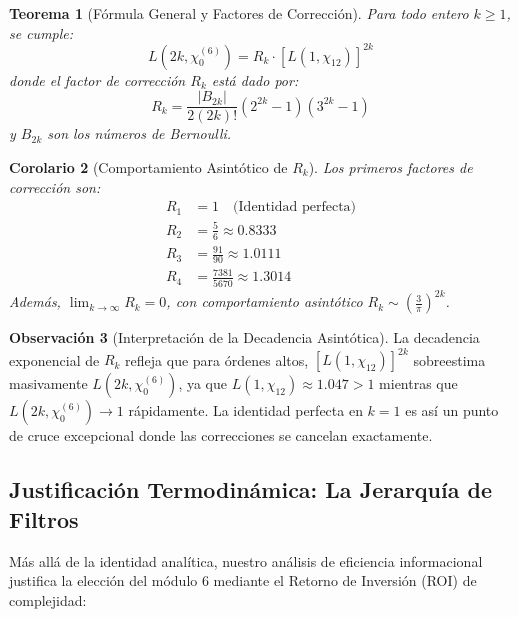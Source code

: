 \documentclass[12pt, a4paper]{article}
\theoremstyle{plain}
\newtheorem{teorema}{Teorema}[section]
\newtheorem{corolario}[teorema]{Corolario}
\theoremstyle{definition}
\newtheorem{observacion}[teorema]{Observación}
\begin{document}
\begin{teorema}[Fórmula General y Factores de Corrección]
\label{teo:factores_correccion}
Para todo entero $k \geq 1$, se cumple:
\[
L(2k,\chi_0^{(6)}) = R_k \cdot [L(1,\chi_{12})]^{2k}
\]
donde el factor de corrección $R_k$ está dado por:
\[
R_k = \frac{|B_{2k}|}{2(2k)!} (2^{2k}-1)(3^{2k}-1)
\]
y $B_{2k}$ son los números de Bernoulli.
\end{teorema}

\begin{corolario}[Comportamiento Asintótico de $R_k$]
Los primeros factores de corrección son:
\begin{align*}
R_1 &= 1 \quad \text{(Identidad perfecta)} \\
R_2 &= \frac{5}{6} \approx 0.8333 \\
R_3 &= \frac{91}{90} \approx 1.0111 \\
R_4 &= \frac{7381}{5670} \approx 1.3014
\end{align*}
Además, $\displaystyle \lim_{k \to \infty} R_k = 0$, con comportamiento asintótico $R_k \sim \left(\frac{3}{\pi}\right)^{2k}$.
\end{corolario}

\begin{observacion}[Interpretación de la Decadencia Asintótica]
La decadencia exponencial de $R_k$ refleja que para órdenes altos, $[L(1,\chi_{12})]^{2k}$ sobreestima masivamente $L(2k,\chi_0^{(6)})$, ya que $L(1,\chi_{12}) \approx 1.047 > 1$ mientras que $L(2k,\chi_0^{(6)}) \to 1$ rápidamente. La identidad perfecta en $k=1$ es así un punto de cruce excepcional donde las correcciones se cancelan exactamente.
\end{observacion}

\subsection{Justificación Termodinámica: La Jerarquía de Filtros}

Más allá de la identidad analítica, nuestro análisis de eficiencia informacional justifica la elección del módulo 6 mediante el Retorno de Inversión (ROI) de complejidad:
\end{document}

